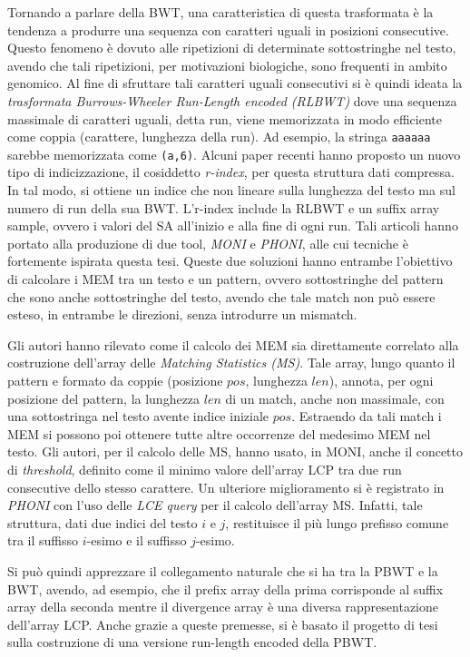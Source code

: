 \documentclass[a4paper,11pt, oneside,italian]{article}
\begin{document}
Tornando a parlare della BWT, una caratteristica di questa trasformata è la
tendenza a produrre una sequenza con caratteri uguali in posizioni
consecutive. Questo fenomeno è dovuto alle ripetizioni di determinate
sottostringhe nel testo, avendo che tali ripetizioni, per motivazioni
biologiche, sono frequenti in ambito genomico.
Al fine di sfruttare tali caratteri uguali consecutivi si 
è quindi ideata la \textit{trasformata Burrows-Wheeler Run-Length
  encoded (RLBWT)} dove una sequenza massimale di caratteri uguali, detta 
run, viene memorizzata in modo efficiente come coppia (carattere,
lunghezza della run). Ad esempio, la stringa \texttt{aaaaaa} sarebbe memorizzata
come \texttt{(a,6)}.
Alcuni paper recenti hanno proposto un nuovo tipo di
indicizzazione, il cosiddetto \textit{r-index}, per questa struttura
dati compressa. In tal modo, si ottiene un indice che non lineare sulla
lunghezza del testo ma sul numero di run della sua BWT. L'r-index include la
RLBWT e un suffix array sample, ovvero i valori del SA all’inizio e alla fine di
ogni run. 
Tali articoli hanno portato alla produzione di due tool, \textit{MONI} e 
\textit{PHONI}, alle cui tecniche è fortemente ispirata questa tesi. Queste due
soluzioni hanno entrambe l'obiettivo di 
calcolare i MEM tra un testo e un pattern, ovvero sottostringhe del pattern che
sono anche sottostringhe del testo, avendo che tale match non può essere esteso,
in entrambe le direzioni, senza introdurre un mismatch. 

Gli autori hanno rilevato come il calcolo dei MEM sia direttamente
correlato alla costruzione dell'array delle \textit{Matching Statistics (MS)}.
Tale array, lungo quanto il pattern e formato da coppie (posizione $pos$,
lunghezza $len$), annota, per ogni posizione del pattern, la lunghezza $len$ di
un match, anche non massimale, con una sottostringa nel testo avente
indice iniziale $pos$. Estraendo da tali match i MEM si possono poi ottenere
tutte altre occorrenze del medesimo MEM nel testo. 
Gli autori, per il calcolo delle MS, hanno
usato, in MONI, anche il concetto di \textit{threshold}, definito come
il minimo valore dell'array LCP tra due run consecutive dello stesso
carattere. Un ulteriore miglioramento si è registrato in \textit{PHONI} con
l'uso delle \textit{LCE query} per il calcolo dell'array MS. Infatti, tale
struttura, dati due indici del testo $i$ e $j$, restituisce il più lungo
prefisso comune tra il suffisso $i$-esimo e il suffisso $j$-esimo.

Si può quindi apprezzare il collegamento naturale che si ha tra la PBWT
e la BWT, avendo, ad esempio, che il prefix array della prima corrisponde
al suffix array della seconda mentre il divergence array è una
diversa rappresentazione dell'array LCP. Anche grazie a queste premesse, si è
basato il progetto di tesi sulla costruzione di una versione run-length encoded
della PBWT.
\end{document}
